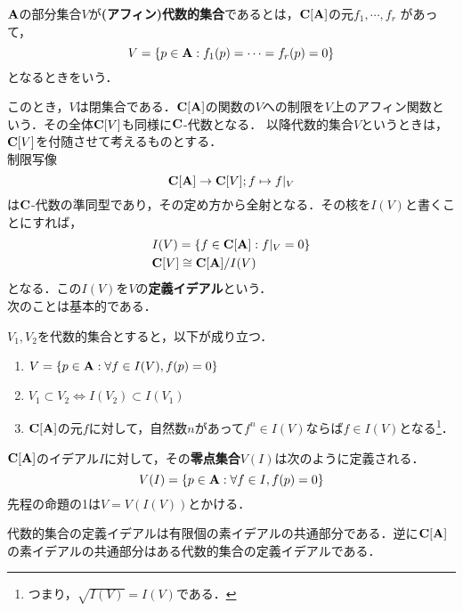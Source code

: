 \documentclass{myclass}
\begin{document}
\begin{definition}
  $\mathbf{A}$の部分集合$V$が\textbf{(アフィン)代数的集合}であるとは，$\mathbf{C}[\mathbf{A}]$の元$f_1,\cdots,f_r$
  があって，
  \begin{equation*}
    V = \{p \in \mathbf{A} : f_1(p) = \cdots = f_r(p) = 0\}
  \end{equation*}
  となるときをいう．
\end{definition}
このとき，$V$は閉集合である．$\mathbf{C}[\mathbf{A}]$の関数の$V$への制限を$V$上のアフィン関数という．その全体$\mathbf{C}[V]$も同様に$\mathbf{C}$-代数となる．
以降代数的集合$V$というときは，$\mathbf{C}[V]$を付随させて考えるものとする．\\
制限写像
\begin{equation*}
  \mathbf{C}[\mathbf{A}] \to \mathbf{C}[V];f\mapsto f|_V
\end{equation*}
は$\mathbf{C}$-代数の準同型であり，その定め方から全射となる．その核を$I(V)$と書くことにすれば，
\begin{align*}
  &I(V) = \{f\in \mathbf{C}[\mathbf{A}] : f|_V = 0\}\\
  &\mathbf{C}[V] \cong \mathbf{C}[\mathbf{A}]/I(V)
\end{align*}
となる．この$I(V)$を$V$の\textbf{定義イデアル}という．\\
次のことは基本的である．

\begin{proposition}
  $V_1,V_2$を代数的集合とすると，以下が成り立つ．
  \begin{enumerate}
    \item $V = \{p \in \mathbf{A} : \forall f \in I(V),f(p) = 0\}$
    \item $V_1\subset V_2 \Leftrightarrow I(V_2)\subset I(V_1)$
    \item $\mathbf{C}[\mathbf{A}]$の元$f$に対して，自然数$n$があって$f^n\in I(V)$ならば$f \in I(V)$となる\footnote{つまり，$\sqrt{I(V)} = I(V)$である．}．
  \end{enumerate}
\end{proposition}

\begin{definition}
  $\mathbf{C}[\mathbf{A}]$のイデアル$I$に対して，その\textbf{零点集合}$V(I)$は次のように定義される．
  \begin{equation*}
    V(I) = \{p\in \mathbf{A} : \forall f \in I, f(p) = 0\}
  \end{equation*}
  先程の命題の1は$V=V(I(V))$とかける．
\end{definition}

\begin{proposition}
  代数的集合の定義イデアルは有限個の素イデアルの共通部分である．逆に$\mathbf{C}[\mathbf{A}]$の素イデアルの共通部分はある代数的集合の定義イデアルである．
\end{proposition}
\end{document}
